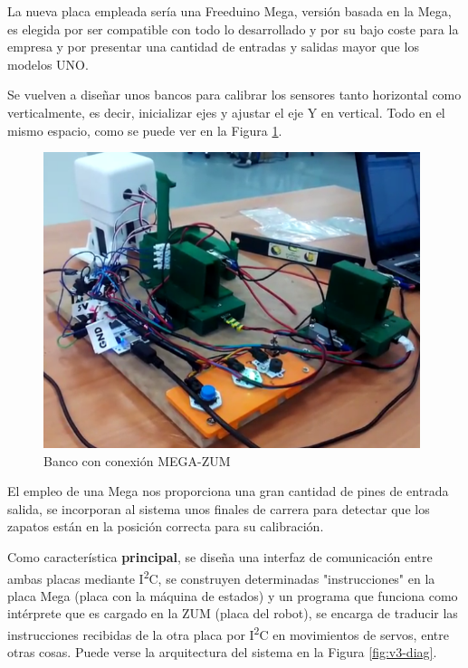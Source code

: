La nueva placa empleada sería una Freeduino Mega, versión basada en la Mega, es elegida por ser compatible con todo lo desarrollado y por su bajo coste para la empresa y por presentar una cantidad de entradas y salidas mayor que los modelos UNO.

Se vuelven a diseñar unos bancos para calibrar los sensores tanto horizontal como verticalmente, es decir, inicializar ejes y ajustar el eje Y en vertical. Todo en el mismo espacio, como se puede ver en la Figura \ref{fig:bancov3}.

\begin{figure}
\centering
\includegraphics[width=110mm]{Figures/banco_v3}
\caption[Banco con conexión MEGA-ZUM]{Banco con conexión MEGA-ZUM}
\label{fig:bancov3}
\end{figure}

El empleo de una Mega nos proporciona una gran cantidad de pines de entrada salida, se incorporan al sistema unos finales de carrera para detectar que los zapatos están en la posición correcta para su calibración.

Como característica \textbf{principal}, se diseña una interfaz de comunicación entre ambas placas mediante I\textsuperscript{2}C, se construyen determinadas "instrucciones" en la placa Mega (placa con la máquina de estados) y un programa que funciona como intérprete que es cargado en la ZUM (placa del robot), se encarga de traducir las instrucciones recibidas de la otra placa por I\textsuperscript{2}C en movimientos de servos, entre otras cosas. Puede verse la arquitectura del sistema en la Figura \ref{fig:v3-diag}.

